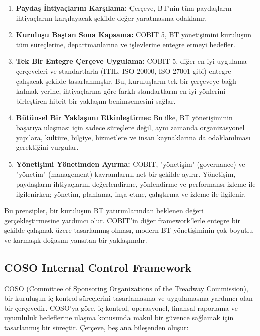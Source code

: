 \begin{enumerate}
    \item \textbf{Paydaş İhtiyaçlarını Karşılama:} Çerçeve, BT'nin tüm paydaşların ihtiyaçlarını karşılayacak şekilde değer yaratmasına odaklanır.
    \item \textbf{Kuruluşu Baştan Sona Kapsama:} COBIT 5, BT yönetişimini kuruluşun tüm süreçlerine, departmanlarına ve işlevlerine entegre etmeyi hedefler.
    \item \textbf{Tek Bir Entegre Çerçeve Uygulama:} COBIT 5, diğer en iyi uygulama çerçeveleri ve standartlarla (ITIL, ISO 20000, ISO 27001 gibi) entegre çalışacak şekilde tasarlanmıştır. Bu, kuruluşların tek bir çerçeveye bağlı kalmak yerine, ihtiyaçlarına göre farklı standartların en iyi yönlerini birleştiren hibrit bir yaklaşım benimsemesini sağlar.
    \item \textbf{Bütünsel Bir Yaklaşımı Etkinleştirme:} Bu ilke, BT yönetişiminin başarıya ulaşması için sadece süreçlere değil, aynı zamanda organizasyonel yapılara, kültüre, bilgiye, hizmetlere ve insan kaynaklarına da odaklanılması gerektiğini vurgular.
    \item \textbf{Yönetişimi Yönetimden Ayırma:} COBIT, "yönetişim" (governance) ve "yönetim" (management) kavramlarını net bir şekilde ayırır. Yönetişim, paydaşların ihtiyaçlarını değerlendirme, yönlendirme ve performansı izleme ile ilgilenirken; yönetim, planlama, inşa etme, çalıştırma ve izleme ile ilgilenir.
\end{enumerate}

Bu prensipler, bir kuruluşun BT yatırımlarından beklenen değeri gerçekleştirmesine yardımcı olur. COBIT'in diğer framework'lerle entegre bir şekilde çalışmak üzere tasarlanmış olması, modern BT yönetişiminin çok boyutlu ve karmaşık doğasını yansıtan bir yaklaşımdır.

\subsection{COSO Internal Control Framework}

COSO (Committee of Sponsoring Organizations of the Treadway Commission), bir kuruluşun iç kontrol süreçlerini tasarlamasına ve uygulamasına yardımcı olan bir çerçevedir. COSO'ya göre, iç kontrol, operasyonel, finansal raporlama ve uyumluluk hedeflerine ulaşma konusunda makul bir güvence sağlamak için tasarlanmış bir süreçtir. Çerçeve, beş ana bileşenden oluşur:

